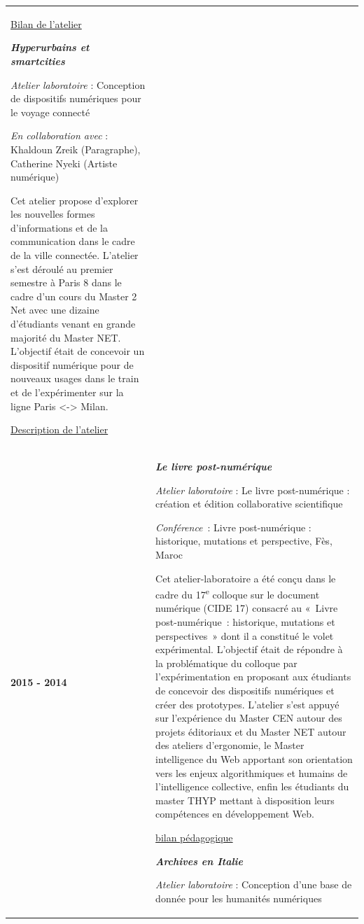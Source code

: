 \documentclass[
  a4paper,
  DIV=11,
  numbers=noendperiod]{scrreprt}
\begin{document}
\begin{longtable}[]{@{}
  >{\raggedright\arraybackslash}p{}
  >{\raggedright\arraybackslash}p{}@{}}
\href{/annexes/ProverbesEducation2015-2016.pdf}{Bilan de l'atelier}

\textbf{\emph{Hyperurbains et smartcities}}

\emph{Atelier laboratoire} : Conception de dispositifs numériques pour
le voyage connecté

\emph{En collaboration avec} : Khaldoun Zreik (Paragraphe), Catherine
Nyeki (Artiste numérique)

Cet atelier propose d'explorer les nouvelles formes d'informations et de
la communication dans le cadre de la ville connectée. L'atelier s'est
déroulé au premier semestre à Paris 8 dans le cadre d'un cours du Master
2 Net avec une dizaine d'étudiants venant en grande majorité du Master
NET. L'objectif était de concevoir un dispositif numérique pour de
nouveaux usages dans le train et de l'expérimenter sur la ligne Paris
\textless-\textgreater{} Milan.

\href{/annexes/hyperurbainV1.pdf}{Description de l'atelier} \\
\textbf{2015 - 2014} & \textbf{\emph{Le livre post-numérique}}

\emph{Atelier laboratoire} : Le livre post-numérique : création et
édition collaborative scientifique

\emph{Conférence}~: Livre post-numérique : historique, mutations et
perspective, Fès, Maroc

Cet atelier-laboratoire a été conçu dans le cadre du
17\textsuperscript{e} colloque sur le document numérique (CIDE 17)
consacré au «~Livre post-numérique~: historique, mutations et
perspectives~» dont il a constitué le volet expérimental. L'objectif
était de répondre à la problématique du colloque par l'expérimentation
en proposant aux étudiants de concevoir des dispositifs numériques et
créer des prototypes. L'atelier s'est appuyé sur l'expérience du Master
CEN autour des projets éditoriaux et du Master NET autour des ateliers
d'ergonomie, le Master intelligence du Web apportant son orientation
vers les enjeux algorithmiques et humains de l'intelligence collective,
enfin les étudiants du master THYP mettant à disposition leurs
compétences en développement Web.

\href{/annexes/creatic-BilanpedagogiqueAtelierlivrepost-numerique_2015.pdf}{bilan
pédagogique}

\textbf{\emph{Archives en Italie}}

\emph{Atelier laboratoire} : Conception d'une base de donnée pour les
humanités numériques \\
\end{longtable}
\end{document}
